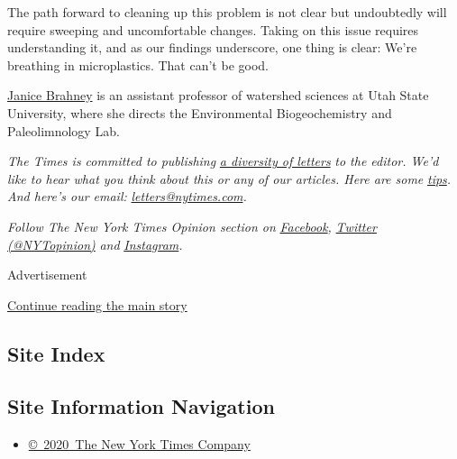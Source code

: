 The path forward to cleaning up this problem is not clear but
undoubtedly will require sweeping and uncomfortable changes. Taking on
this issue requires understanding it, and as our findings underscore,
one thing is clear: We're breathing in microplastics. That can't be
good.

\href{https://qcnr.usu.edu/directory/brahney_janice}{Janice Brahney} is
an assistant professor of watershed sciences at Utah State University,
where she directs the Environmental Biogeochemistry and Paleolimnology
Lab.

\emph{The Times is committed to publishing}
\href{https://www.nytimes.com/2019/01/31/opinion/letters/letters-to-editor-new-york-times-women.html}{\emph{a
diversity of letters}} \emph{to the editor. We'd like to hear what you
think about this or any of our articles. Here are some}
\href{https://help.nytimes.com/hc/en-us/articles/115014925288-How-to-submit-a-letter-to-the-editor}{\emph{tips}}\emph{.
And here's our email:}
\href{mailto:letters@nytimes.com}{\emph{letters@nytimes.com}}\emph{.}

\emph{Follow The New York Times Opinion section on}
\href{https://www.facebook.com/nytopinion}{\emph{Facebook}}\emph{,}
\href{http://twitter.com/NYTOpinion}{\emph{Twitter (@NYTopinion)}}
\emph{and}
\href{https://www.instagram.com/nytopinion/}{\emph{Instagram}}\emph{.}

Advertisement

\protect\hyperlink{after-bottom}{Continue reading the main story}

\hypertarget{site-index}{%
\subsection{Site Index}\label{site-index}}

\hypertarget{site-information-navigation}{%
\subsection{Site Information
Navigation}\label{site-information-navigation}}

\begin{itemize}
\tightlist
\item
  \href{https://help.nytimes.com/hc/en-us/articles/115014792127-Copyright-notice}{©~2020~The
  New York Times Company}
\end{itemize}

